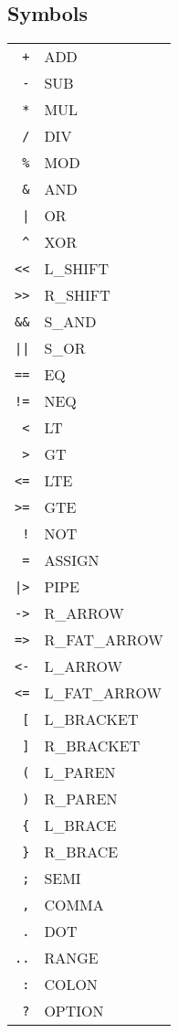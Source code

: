 \documentclass{article}
\begin{document}
		\subsection{Symbols}
			\begin{tabular}{rl}
				\texttt{+} & ADD\\
				\texttt{-} & SUB\\
				\texttt{*} & MUL\\
				\texttt{/} & DIV\\
				\texttt{\%} & MOD\\
				\texttt{\&} & AND\\
				\texttt{|} & OR\\
				\texttt{\^} & XOR\\
				\texttt{<<} & L\_SHIFT\\
				\texttt{>>} & R\_SHIFT\\
				\texttt{\&\&} & S\_AND\\
				\texttt{||} & S\_OR\\
				\texttt{==} & EQ\\
				\texttt{!=} & NEQ\\
				\texttt{<} & LT\\
				\texttt{>} & GT\\
				\texttt{<=} & LTE\\
				\texttt{>=} & GTE\\
				\texttt{!} & NOT\\
				\texttt{=} & ASSIGN\\
				\texttt{|>} & PIPE\\
				\texttt{->} & R\_ARROW\\
				\texttt{=>} & R\_FAT\_ARROW\\
				\texttt{<-} & L\_ARROW\\
				\texttt{<=} & L\_FAT\_ARROW\\
				\texttt{[} & L\_BRACKET\\
				\texttt{]} & R\_BRACKET\\
				\texttt{(} & L\_PAREN\\
				\texttt{)} & R\_PAREN\\
				\texttt{\{} & L\_BRACE\\
				\texttt{\}} & R\_BRACE\\
				\texttt{;} & SEMI\\
				\texttt{,} & COMMA\\
				\texttt{.} & DOT\\
				\texttt{..} & RANGE\\
				\texttt{:} & COLON\\
				\texttt{?} & OPTION\\
			\end{tabular}
\end{document}
